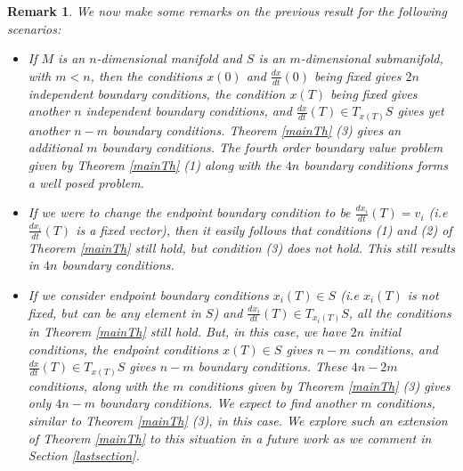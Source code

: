 \documentclass[letterpaper, 10 pt, conference]{ieeeconf}  %
\newtheorem{remarkth}[definition]{Remark}
\newenvironment{remark}{\begin{remarkth}\upshape}{\end{remarkth}}
\begin{document}
\begin{remark}
%
We now make some remarks on the previous result for the following scenarios:
%
\begin{itemize}
%
\item If $M$ is an $n$-dimensional manifold and $S$ is an $m$-dimensional submanifold, with $m < n$, then the conditions $x(0)$ and $\frac{dx}{dt}(0)$ being fixed gives $2n$ independent boundary conditions, the condition $x(T)$ being fixed gives another $n$ independent boundary conditions, and $\frac{dx}{dt}(T) \in T_{x(T)}S$ gives yet another $n-m$ boundary conditions. Theorem \ref{mainTh} (3) gives an additional $m$ boundary conditions. The fourth order boundary value problem given by Theorem \ref{mainTh} (1) along with the $4n$ boundary conditions forms a well posed problem. 
%
\item If we were to change the endpoint boundary condition to be $\frac{d x_i}{dt}(T) = v_i$ (i.e $\frac{d x_i}{dt}(T)$ is a fixed vector), then it easily follows that conditions (1) and (2) of Theorem \ref{mainTh} still hold, but condition (3) does not hold. This still results in $4n$ boundary conditions. 
%
\item If we consider endpoint boundary conditions $x_i(T)\in S$ (i.e $x_i(T)$ is not fixed, but can be any element in $S$) and $\frac{dx_i}{dt}(T)\in T_{x_i(T)}S$, all the conditions in Theorem \ref{mainTh} still hold. But, in this case, we have $2n$ initial conditions, the endpoint conditions $x(T) \in S$ gives $n-m$ conditions, and $\frac{dx}{dt}(T) \in T_{x(T)}S$ gives $n-m$ boundary conditions. These $4n-2m$ conditions, along with the $m$ conditions given by Theorem \ref{mainTh} (3) gives only $4n-m$ boundary conditions. We expect to find another $m$ conditions, similar to Theorem \ref{mainTh} (3), in this case. We explore such an extension of Theorem \ref{mainTh} to this situation in a future work as we comment in Section \ref{lastsection}.
%
\end{itemize}
%
\end{remark}

%
\end{document}
